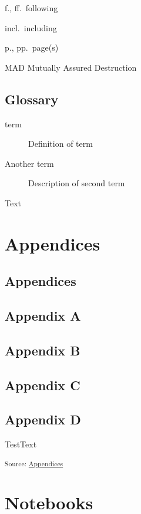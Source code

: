 \documentclass[12pt,a4paper]{report}      %
\begin{document}
f., ff.~following

incl.~including

p., pp.~page(s)

MAD Mutually Assured Destruction

\section*{Glossary}\label{glossary}

\begin{description}
\item[term]
Definition of term
\item[Another term]
Description of second term
\end{description}

Text

\chapter{Appendices}\label{appendices}

\section{Appendices}\label{appendices-1}

\section{Appendix A}\label{appendix-a}

\section{Appendix B}\label{appendix-b}

\section{Appendix C}\label{appendix-c}

\section{Appendix D}\label{appendix-d}

TestText

\textsubscript{Source:
\href{https://VJMeyer.github.io/submission/chapters/Appendices.qmd.html\#66f55ce1-d4e4-4377-be30-005a37fa8c63}{Appendices}}

\chapter*{Notebooks}\label{notebooks}


\end{document}
